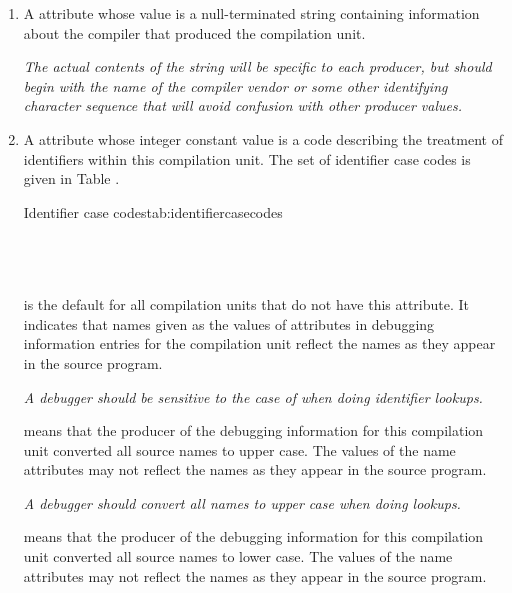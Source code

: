 \begin{enumerate}[1. ]
\item  \hypertarget{chap:DWATproducercompileridentification}{}
A \DWATproducerDEFN{} attribute
whose value is a null-terminated string containing 
information about the compiler that produced the compilation unit. 

\textit{The actual contents of
the string will be specific to each producer, but should
begin with the name of the compiler vendor or some other
identifying character sequence that will avoid confusion
with other producer values.}

\item  \hypertarget{chap:DWATidentifiercaseidentifiercaserule}{}
A \DWATidentifiercaseDEFN{} attribute 
 whose integer
constant value is a code describing the treatment
of identifiers within this compilation unit. The
set of identifier case codes is given in
Table .

\begin{simplenametable}{Identifier case codes}{tab:identifiercasecodes}
\DWIDcasesensitive{}      \\
\DWIDupcase{}             \\
\DWIDdowncase{}           \\
\DWIDcaseinsensitive{}    \\
\end{simplenametable}

\DWIDcasesensitiveTARG{} is the default for all compilation units
that do not have this attribute.  It indicates that names given
as the values of \DWATname{} attributes 
in debugging information
entries for the compilation unit reflect the names as they
appear in the source program. 

\textit{A debugger should be sensitive
to the case of  when doing identifier 
lookups.}

\DWIDupcaseTARG{} means that the 
producer of the debugging
information for this compilation unit converted all source
names to upper case. The values of the name attributes may not
reflect the names as they appear in the source program. 

\textit{A debugger should convert all names to upper case 
when doing lookups.}

\DWIDdowncaseTARG{} means that the producer of the debugging
information for this compilation unit converted all source
names to lower case. The values of the name attributes may not
reflect the names as they appear in the source program. 


\end{enumerate}
